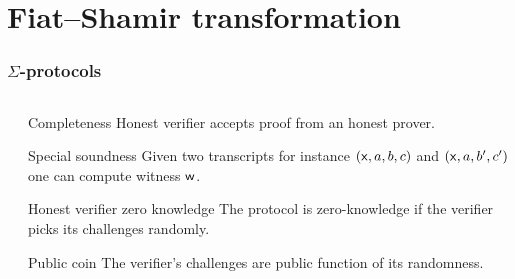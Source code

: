 \documentclass[aspectratio=169,handout]{beamer}
\begin{document}
\section{Fiat--Shamir transformation}
\begin{frame}
  \frametitle{$\Sigma$-protocols}
  \begin{columns}
    \begin{column}{.3\linewidth}
    \end{column}
    \begin{column}{.6\linewidth}
      \begin{block}{Completeness}
        Honest verifier accepts proof from an honest prover.
      \end{block}
      \begin{block}{Special soundness}
        Given two transcripts for instance $(\mathsf{x}, a, b, c)$ and
        $(\mathsf{x}, a, b', c')$ one can compute witness $\mathsf{w}$.
      \end{block}
      \begin{block}{Honest verifier zero knowledge}
        The protocol is zero-knowledge if the verifier picks its challenges randomly.
      \end{block}
      \begin{block}{Public coin}
        The verifier's challenges are public function of its randomness.
      \end{block}
    \end{column}
  \end{columns}
\end{frame}
\end{document}
